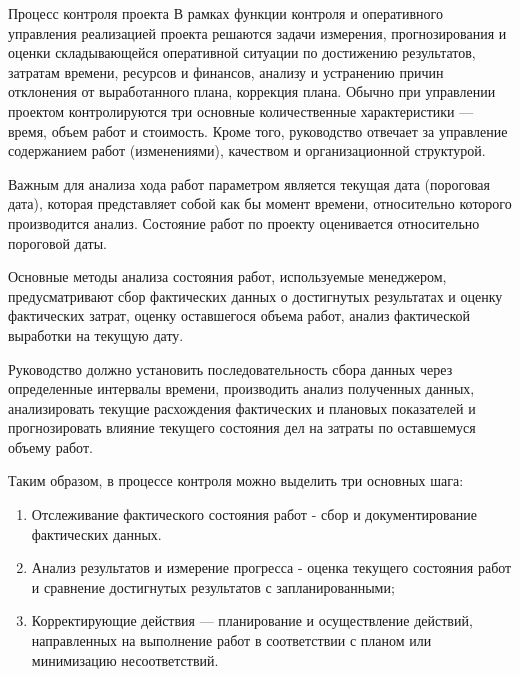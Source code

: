 Процесс контроля проекта
В рамках функции контроля и оперативного управления реализацией проекта решаются задачи измерения, прогнозирования и оценки складывающейся оперативной ситуации по достижению результатов, затратам времени, ресурсов и финансов, анализу и устранению причин отклонения от выработанного плана, коррекция плана.
Обычно при управлении проектом контролируются три основные количественные характеристики --- время, объем работ и стоимость.
Кроме того, руководство отвечает за управление содержанием работ (изменениями), качеством и организационной структурой.

Важным для анализа хода работ параметром является текущая дата (пороговая дата), которая представляет собой как бы момент времени, относительно которого производится анализ.
Состояние работ по проекту оценивается относительно пороговой даты.

Основные методы анализа состояния работ, используемые менеджером, предусматривают сбор фактических данных о достигнутых результатах и оценку фактических затрат, оценку оставшегося объема работ, анализ фактической выработки на текущую дату.

Руководство должно установить последовательность сбора данных через определенные интервалы времени, производить анализ полученных данных, анализировать текущие расхождения фактических и плановых показателей и прогнозировать влияние текущего состояния дел на затраты по оставшемуся объему работ.

Таким образом, в процессе контроля можно выделить три основных шага:

\begin{enumerate}
	\item Отслеживание фактического состояния работ - сбор и документирование фактических данных.
	\item Анализ результатов и измерение прогресса - оценка текущего состояния работ и сравнение достигнутых результатов с запланированными;
	\item Корректирующие действия --- планирование и осуществление действий, направленных на выполнение работ в соответствии с планом или минимизацию несоответствий.
\end{enumerate}

